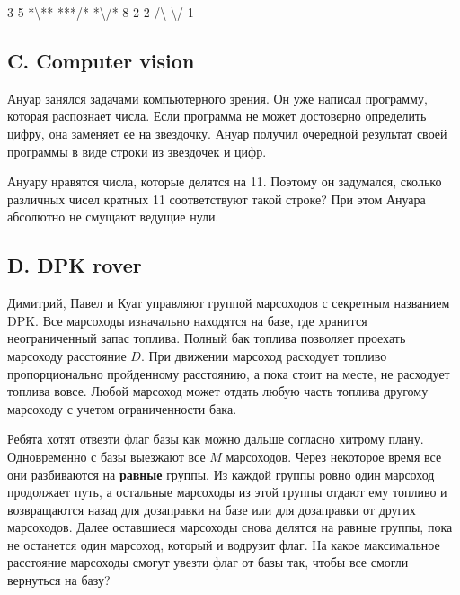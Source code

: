 
\examplee
{
3 5 \newline
*\textbackslash***\newline
***/*\newline
*\textbackslash*/*
}
{8}
{
2 2 \newline
/\textbackslash \newline
\textbackslash/}
{1}




\subsection*{C. Computer vision}
 

Ануар занялся задачами компьютерного зрения. Он уже написал программу, которая распознает числа. Если программа не может достоверно определить цифру, она заменяет ее на звездочку. Ануар получил очередной результат своей программы в виде строки из звездочек и цифр. 

Ануару нравятся числа, которые делятся на 11. Поэтому он задумался, сколько различных чисел кратных 11 соответствуют такой строке? При этом Ануара абсолютно не смущают ведущие нули.







\subsection*{D. DPK rover}
 

Димитрий, Павел и Куат управляют группой марсоходов с секретным названием DPK. Все марсоходы изначально находятся на базе, где хранится неограниченный запас топлива. Полный бак топлива позволяет проехать марсоходу расстояние $D$. При движении марсоход расходует топливо пропорционально пройденному расстоянию, а пока стоит на месте, не расходует топлива вовсе. Любой марсоход может отдать любую часть топлива другому марсоходу с учетом ограниченности бака.

Ребята хотят отвезти флаг базы как можно дальше согласно хитрому плану. Одновременно с базы выезжают все $M$ марсоходов. Через некоторое время все они разбиваются на \textbf{равные} группы. Из каждой группы ровно один марсоход продолжает путь, а остальные марсоходы из этой группы отдают ему топливо и возвращаются назад для дозаправки на базе или для дозаправки от других марсоходов. Далее оставшиеся марсоходы снова делятся на равные группы, пока не останется один марсоход, который и водрузит флаг. На какое максимальное расстояние марсоходы смогут увезти флаг от базы так, чтобы все смогли вернуться на базу?

